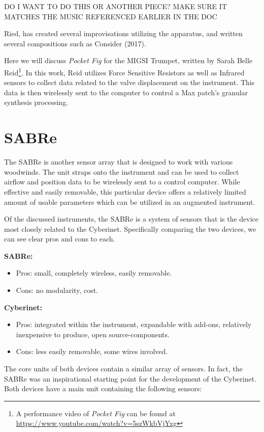DO I WANT TO DO THIS OR ANOTHER PIECE? MAKE SURE IT MATCHES THE MUSIC REFERENCED EARLIER IN THE DOC

Ried, has created several improvisations utilizing the apparatus, and written several compositions such as Consider (2017).

Here we will discuss \textit{Pocket Fig} for the MIGSI Trumpet, written by Sarah Belle Reid\footnote{A performance video of \textit{Pocket Fig} can be found at \url{https://www.youtube.com/watch?v=5szWkbVjYxg}}. In this work, Reid utilizes Force Sensitive Resistors as well as Infrared sensors to collect data related to the valve displacement on the instrument. This data is then wirelessly sent to the computer to control a Max patch's granular synthesis processing.

\section{SABRe}

The SABRe is another sensor array that is designed to work with various woodwinds. The unit straps onto the instrument and can be used to collect airflow and position data to be wirelessly sent to a control computer. While effective and easily removable, this particular device offers a relatively limited amount of usable parameters which can be utilized in an augmented instrument.

Of the discussed instruments, the SABRe is a system of sensors that is the device most closely related to the Cyberinet. Specifically comparing the two devices, we can see clear pros and cons to each.

\textbf{SABRe:}

\begin{itemize}
    \item Pros: small, completely wireless, easily removable.
    \item Cons: no modularity, cost.
\end{itemize}

\textbf{Cyberinet:} 

\begin{itemize}
    \item Pros: integrated within the instrument, expandable with add-ons, relatively inexpensive to produce, open source-components.
    \item Cons: less easily removable, some wires involved.
\end{itemize}

The core units of both devices contain a similar array of sensors. In fact, the SABRe was an inspirational starting point for the development of the Cyberinet. Both devices have a main unit containing the following sensors:

